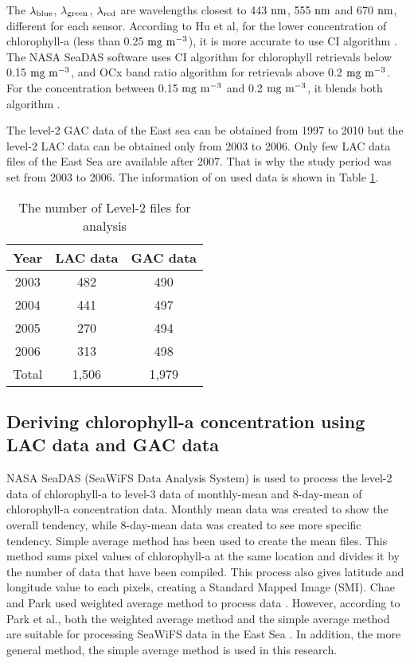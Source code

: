 The $\rm {\lambda}_{blue}$, $\rm {\lambda}_{green}$, $\rm {\lambda}_{red}$ are wavelengths closest to 443 $\rm nm$, 555 $\rm nm$ and 670 $\rm nm$, different for each sensor. According to Hu et al, for the lower concentration of chlorophyll-a (less than 0.25 $\rm mg~m^{-3}$), it is more accurate to use CI algorithm \cite{hu2012chlorophyll}. The NASA SeaDAS software uses CI algorithm for chlorophyll retrievals below 0.15 $\rm mg~m^{-3}$, and OCx band ratio algorithm for retrievals above 0.2 $\rm mg~m^{-3}$. For the concentration between 0.15 $\rm mg~m^{-3}$ and 0.2 $\rm mg~m^{-3}$, it blends both algorithm \cite{NASASeaFiWSdata}.


The level-2 GAC data of the East sea can be obtained from 1997 to 2010 but the level-2 LAC data can be obtained only from 2003 to 2006. Only few LAC data files of the East Sea are available after 2007. That is why the study period was set from 2003 to 2006. The information of on used data is shown in Table \ref{data_information}.


 \begin{table}[h]
	\centering
	\caption{The number of Level-2 files for analysis}
	\label{data_information}
	\begin{tabular}{c  c  c  }
		\toprule
		Year & LAC data  & GAC data \\ %
		\midrule
		2003 & 482 & 490 \\ %
		2004 & 441 & 497 \\ %
		2005 & 270 & 494 \\ %
		2006 & 313 & 498 \\ %
			\midrule
		Total & 1,506 & 1,979 \\ %
		\bottomrule
	\end{tabular}
\end{table}




\hfill \break


 \subsection{Deriving chlorophyll-a concentration using LAC data and GAC data}
 
NASA SeaDAS (SeaWiFS Data Analysis System) is used to process the level-2 data of chlorophyll-a to level-3 data of monthly-mean and 8-day-mean of chlorophyll-a concentration data. Monthly mean data was created to show the overall tendency, while 8-day-mean data was created to see more specific tendency. Simple average method has been used to create the mean files. This method sums pixel values of chlorophyll-a at the same location and divides it by the number of data that have been compiled. This process also gives latitude and longitude value to each pixels, creating a Standard Mapped Image (SMI). Chae and Park used weighted average method to process data \cite{chae2009characteristics}. However, according to Park et al., both the weighted average method and the simple average method are suitable for processing SeaWiFS data in the East Sea \cite{park2012comparison}. In addition, the more general method, the simple average method is used in this research.


